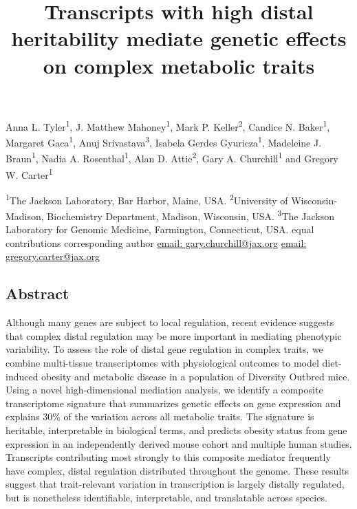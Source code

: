 \documentclass[
]{article}
\title{Transcripts with high distal heritability mediate genetic effects
on complex metabolic traits}
\author{}
\date{\vspace{-2.5em}}
\begin{document}
\maketitle

Anna L. Tyler\textsuperscript{1}\text{*}, J. Matthew
Mahoney\textsuperscript{1}\text{*}, Mark P. Keller\textsuperscript{2},
Candice N. Baker\textsuperscript{1}, Margaret Gaca\textsuperscript{1},
Anuj Srivastava\textsuperscript{3}, Isabela Gerdes
Gyuricza\textsuperscript{1}, Madeleine J. Braun\textsuperscript{1},
Nadia A. Rosenthal\textsuperscript{1}, Alan D. Attie\textsuperscript{2},
Gary A.
Churchill\textsuperscript{1}\textsuperscript{\textdagger}\textsuperscript{\Letter}
and Gregory W.
Carter\textsuperscript{1}\textsuperscript{\textdagger}\textsuperscript{\Letter}

\textsuperscript{1}The Jackson Laboratory, Bar Harbor, Maine, USA.
\textsuperscript{2}University of Wisconsin-Madison, Biochemistry
Department, Madison, Wisconsin, USA. \textsuperscript{3}The Jackson
Laboratory for Genomic Medicine, Farmington, Connecticut, USA.
\text{*}equal contributions \textsuperscript{\textdagger}corresponding
author
\textsuperscript{\Letter}\href{mailto:gary.churchill@jax.org}{email: gary.churchill@jax.org}
\textsuperscript{\Letter}\href{mailto:gregory.carter@jax.org}{email: gregory.carter@jax.org}

\subsection{Abstract}\label{abstract}

Although many genes are subject to local regulation, recent evidence
suggests that complex distal regulation may be more important in
mediating phenotypic variability. To assess the role of distal gene
regulation in complex traits, we combine multi-tissue transcriptomes
with physiological outcomes to model diet-induced obesity and metabolic
disease in a population of Diversity Outbred mice. Using a novel
high-dimensional mediation analysis, we identify a composite
transcriptome signature that summarizes genetic effects on gene
expression and explains 30\% of the variation across all metabolic
traits. The signature is heritable, interpretable in biological terms,
and predicts obesity status from gene expression in an independently
derived mouse cohort and multiple human studies. Transcripts
contributing most strongly to this composite mediator frequently have
complex, distal regulation distributed throughout the genome. These
results suggest that trait-relevant variation in transcription is
largely distally regulated, but is nonetheless identifiable,
interpretable, and translatable across species.
\end{document}
